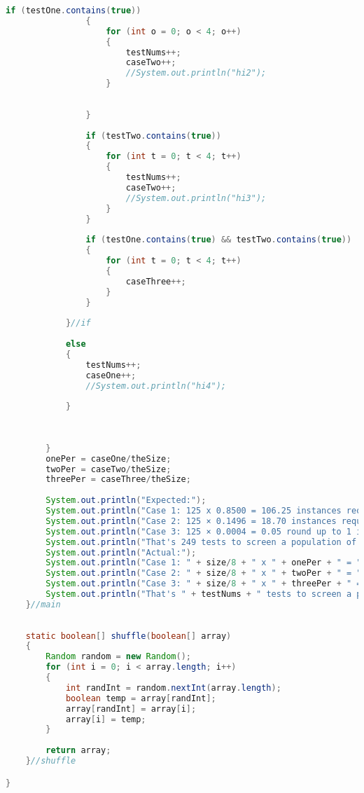 \documentclass[letterpaper, 10pt]{article}
\begin{document}
\begin{lstlisting}[language = java]
				if (testOne.contains(true))
				{
					for (int o = 0; o < 4; o++)
					{
						testNums++;
						caseTwo++;
						//System.out.println("hi2");
					}
						
					
				}
				
				if (testTwo.contains(true))
				{
					for (int t = 0; t < 4; t++)
					{
						testNums++;
						caseTwo++;
						//System.out.println("hi3");
					}
				}
				
				if (testOne.contains(true) && testTwo.contains(true))
				{
					for (int t = 0; t < 4; t++)
					{
						caseThree++;
					}
				}
				
			}//if
			
			else
			{
				testNums++;
				caseOne++;
				//System.out.println("hi4");
				
			}
			
			
			
		}
		onePer = caseOne/theSize;
		twoPer = caseTwo/theSize;
		threePer = caseThree/theSize;
		
		System.out.println("Expected:");
		System.out.println("Case 1: 125 x 0.8500 = 106.25 instances requiring 107 tests (since there are no partial tests)");
		System.out.println("Case 2: 125 × 0.1496 = 18.70 instances requiring 131 tests");
		System.out.println("Case 3: 125 × 0.0004 = 0.05 round up to 1 instance requiring 11 tests");
		System.out.println("That's 249 tests to screen a population of 1000 people for a disease with an infection rate of 2%.");
		System.out.println("Actual:");
		System.out.println("Case 1: " + size/8 + " x " + onePer + " = " + ((size/3) * (onePer)) + " instances requiring " + caseOne + " tests (since there are no partial tests)");
		System.out.println("Case 2: " + size/8 + " x " + twoPer + " = " + ((size/3) * (twoPer)) + " instances requiring " + caseTwo + " tests");
		System.out.println("Case 3: " + size/8 + " x " + threePer + " = " + ((size/3) * (threePer)) + " instances requiring " + caseThree + " tests");
		System.out.println("That's " + testNums + " tests to screen a population of " + size + " people for a disease with an infection rate of 2%.");
	}//main
	
	
	static boolean[] shuffle(boolean[] array)
	{
		Random random = new Random();
		for (int i = 0; i < array.length; i++)
		{
			int randInt = random.nextInt(array.length);
			boolean temp = array[randInt];
			array[randInt] = array[i];
			array[i] = temp;
		}
		
		return array;
	}//shuffle

}


\end{lstlisting}
\end{document}
